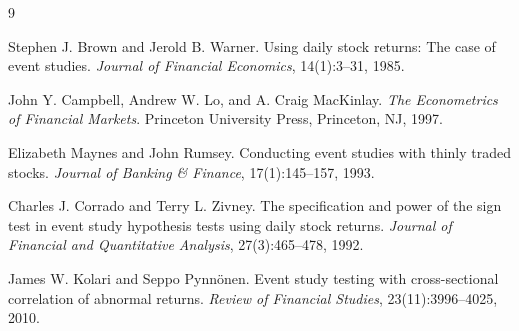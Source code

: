 \documentclass[11pt]{article}
\begin{document}
\begin{thebibliography}{9}

Stephen J. Brown and Jerold B. Warner.
\newblock Using daily stock returns: The case of event studies.
\newblock \emph{Journal of Financial Economics}, 14(1):3--31, 1985.

John Y. Campbell, Andrew W. Lo, and A. Craig MacKinlay.
\newblock \emph{The Econometrics of Financial Markets}.
\newblock Princeton University Press, Princeton, NJ, 1997.

Elizabeth Maynes and John Rumsey.
\newblock Conducting event studies with thinly traded stocks.
\newblock \emph{Journal of Banking \& Finance}, 17(1):145--157, 1993.

Charles J. Corrado and Terry L. Zivney.
\newblock The specification and power of the sign test in event study hypothesis
tests using daily stock returns.
\newblock \emph{Journal of Financial and Quantitative Analysis}, 27(3):465--478,
1992.

James W. Kolari and Seppo Pynn\"{o}nen.
\newblock Event study testing with cross-sectional correlation of abnormal
returns.
\newblock \emph{Review of Financial Studies}, 23(11):3996--4025, 2010.

\end{thebibliography}
\end{document}
